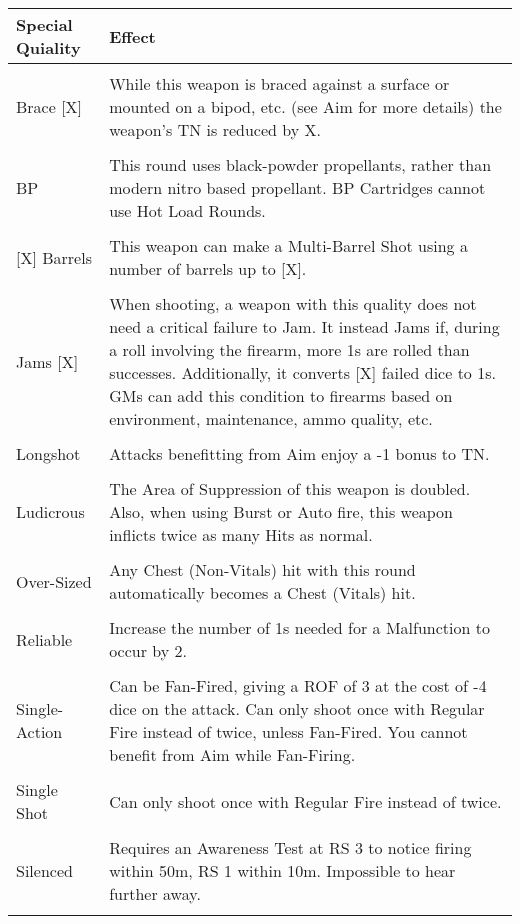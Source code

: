 \documentclass[a4paper, twocolumn, openany]{book}
\begin{document}
{{	{\centering
	\noindent
	\begin{tabular}{lp{14cm}}
	Special Quiality 	& Effect \\ \hline \\
	Brace [X] 			& While this weapon is braced against a surface or mounted on a bipod, etc. (see Aim for more details) the weapon’s TN is reduced by X.\\ \\
	BP 					& This round uses black-powder propellants, rather than modern nitro based propellant. BP Cartridges cannot use Hot Load Rounds.\\ \\
	{[}X{]} Barrels 	& This weapon can make a Multi-Barrel Shot using a number of barrels up to [X].\\ \\
	Jams [X] 			& When shooting, a weapon with this quality does not need a critical failure to Jam. It instead Jams if, during a roll involving the firearm, more 1s are rolled than successes. Additionally, it converts [X] failed dice to 1s. GMs can add this condition to firearms based on environment, maintenance, ammo quality, etc.\\ \\
	Longshot 			& Attacks benefitting from Aim enjoy a -1 bonus to TN.\\ \\
	Ludicrous 			& The Area of Suppression of this weapon is doubled. Also, when using Burst or Auto fire, this weapon inflicts twice as many Hits as normal.\\ \\
	Over-Sized 			& Any Chest (Non-Vitals) hit with this round automatically becomes a Chest (Vitals) hit.\\ \\
	Reliable 			& Increase the number of 1s needed for a Malfunction to occur by 2.\\ \\
	Single-Action 		& Can be Fan-Fired, giving a ROF of 3 at the cost of -4 dice on the attack. Can only shoot once with Regular Fire instead of twice, unless Fan-Fired. You cannot benefit from Aim while Fan-Firing.\\ \\
	Single Shot 		& Can only shoot once with Regular Fire instead of twice.\\ \\
	Silenced 			& Requires an Awareness Test at RS 3 to notice firing within 50m, RS 1 within 10m. Impossible to hear further away.\\ \\

\end{tabular}}}}
\end{document}
